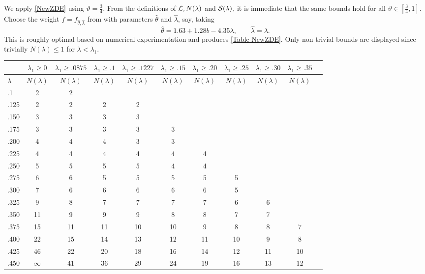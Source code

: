 \documentclass[12pt,psamsfonts]{amsart}
\theoremstyle{definition}
\theoremstyle{remark}
\numberwithin{equation}{section}
\begin{document}
We apply \cref{NewZDE} using $\vartheta = \tfrac{3}{4}$. From the definitions of $\mathcal{L}, N(\lambda)$ and $\mathcal{S}(\lambda)$, it is immediate that the same bounds hold for all $\vartheta \in [\tfrac{3}{4}, 1]$. Choose the weight $f = f_{\hat{\theta}, \hat{\lambda}}$ from \cite[Lemma 7.1]{HBLinnik} with parameters $\hat{\theta}$ and $\hat{\lambda}$, say, taking
\[
\hat{\theta} =  1.63 + 1.28 b - 4.35 \lambda,  \qquad \hat{\lambda} = \lambda.
\]  
This is roughly optimal based on numerical experimentation and produces \cref{Table-NewZDE}. Only non-trivial bounds are displayed since trivially $N(\lambda) \leq 1$ for $\lambda < \lambda_1$. 
\begin{table}
\hspace*{-0.3in}
\begin{tabular}{l|c|c|c|c|c|c|c|c|c|c} 
 & $\lambda_1 \geq 0$ & $\lambda_1 \geq .0875$ & $\lambda_1 \geq .1$ & $\lambda_1 \geq .1227$ & $\lambda_1 \geq .15$ & $\lambda_1 \geq .20$ & $\lambda_1 \geq .25$ & $\lambda_1 \geq .30$ & $\lambda_1 \geq .35$  \\ 
 \hline 
 $\lambda $ & $N(\lambda)$ & $N(\lambda)$ & $N(\lambda)$ & $N(\lambda)$ & $N(\lambda)$ & $N(\lambda)$ & $N(\lambda)$ & $N(\lambda)$ & $N(\lambda)$ \\ 
 \hline 
 .1 &  2 &  2 &  &  &  &  &  &  &  \\ 
 .125 &  2 &  2 &  2 &  2 &  &  &  &  &  \\ 
 .150 &  3 &  3 &  3 &  3 &  &  &  &  &  \\ 
 .175 &  3 &  3 &  3 &  3 &  3 &  &  &  &  \\ 
 .200 &  4 &  4 &  4 &  3 &  3 &  &  &  &  \\ 
 .225 &  4 &  4 &  4 &  4 &  4 &  4 &  &  &  \\ 
 .250 &  5 &  5 &  5 &  5 &  4 &  4 &  &  &  \\ 
 .275 &  6 &  6 &  5 &  5 &  5 &  5 &  5 &  &  \\ 
 .300 &  7 &  6 &  6 &  6 &  6 &  6 &  5 &  &  \\ 
 .325 &  9 &  8 &  7 &  7 &  7 &  7 &  6 &  6 &  \\ 
 .350 &  11 &  9 &  9 &  9 &  8 &  8 &  7 &  7 &  \\ 
 .375 &  15 &  11 &  11 &  10 &  10 &  9 &  8 &  8 &  7 \\ 
 .400 &  22 &  15 &  14 &  13 &  12 &  11 &  10 &  9 &  8 \\ 
 .425 &  46 &  22 &  20 &  18 &  16 &  14 &  12 &  11 &  10 \\ 
 .450 &  $\infty$ &  41 &  36 &  29 &  24 &  19 &  16 &  13 &  12 \\ 

\end{tabular}
\end{table}
\end{document}
